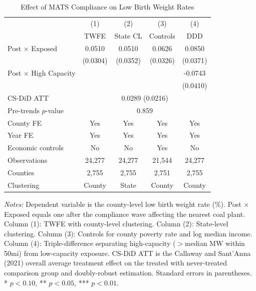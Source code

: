 \begin{table}[t]
\centering
\caption{Effect of MATS Compliance on Low Birth Weight Rates}
\label{tab:main}
\begin{tabular}{lcccc}
\toprule
 & (1) & (2) & (3) & (4) \\
 & TWFE & State CL & Controls & DDD \\
\midrule
Post $\times$ Exposed & 0.0510 & 0.0510 & 0.0626 & 0.0850 \\
 & (0.0304) & (0.0352) & (0.0326) & (0.0371) \\
Post $\times$ High Capacity & & & & -0.0743 \\
 & & & & (0.0410) \\
\midrule
CS-DiD ATT & \multicolumn{4}{c}{0.0289 (0.0216)} \\
Pre-trends $p$-value & \multicolumn{4}{c}{0.859} \\
\midrule
County FE & Yes & Yes & Yes & Yes \\
Year FE & Yes & Yes & Yes & Yes \\
Economic controls & No & No & Yes & No \\
Observations & 24,277 & 24,277 & 21,544 & 24,277 \\
Counties & 2,755 & 2,755 & 2,751 & 2,755 \\
Clustering & County & State & County & County \\
\bottomrule
\end{tabular}
\begin{tablenotes}
\item \textit{Notes:} Dependent variable is the county-level low birth weight rate (\%). Post $\times$ Exposed equals one after the compliance wave affecting the nearest coal plant. Column (1): TWFE with county-level clustering. Column (2): State-level clustering. Column (3): Controls for county poverty rate and log median income. Column (4): Triple-difference separating high-capacity ($>$median MW within 50mi) from low-capacity exposure. CS-DiD ATT is the Callaway and Sant'Anna (2021) overall average treatment effect on the treated with never-treated comparison group and doubly-robust estimation. Standard errors in parentheses. * $p<0.10$, ** $p<0.05$, *** $p<0.01$.
\end{tablenotes}
\end{table}

